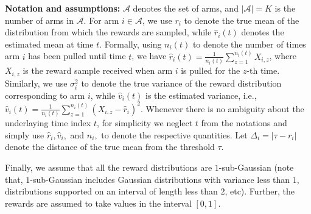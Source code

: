 \textbf{Notation and assumptions:} $\mathcal{A}$ denotes the set of arms, and $|\mathcal{A}|=K$ is the number of arms in $\mathcal{A}$. 
For arm $i\in\mathcal{A}$, we use $r_{i}$ to denote the true mean of the distribution from which the rewards are sampled, while $\hat{r}_{i}(t)$ denotes the estimated mean at time $t$. Formally, using $n_i(t)$ to denote the number of times arm $i$ has been pulled until time $t$, we have $\hat{r}_{i}(t)=\frac{1}{n_{i}(t)}\sum_{z=1}^{n_i(t)} X_{i,z}$, where $X_{i,z}$ is the reward sample received when arm $i$ is pulled for the $z$-th time. %
Similarly, we use $\sigma_{i}^{2}$ to denote the true variance of the reward distribution corresponding to arm $i$, while $\hat{v}_{i}(t)$ is the estimated variance, i.e., $\hat{v}_{i}(t)=\frac{1}{n_i(t)}\sum_{z=1}^{n_{i}(t)}(X_{i,z}-\hat{r}_{i})^{2}$. Whenever there is no ambiguity about the underlaying  time index $t$, for simplicity we neglect $t$ from the notations and simply use  $\hat{r}_i, \hat{v}_i,$ and $n_i, $ to denote the respective quantities.  Let  $\Delta_{i}=|\tau-r_{i}|$ denote the distance of the true mean from the threshold $\tau$.




 
Finally, we assume that all the reward distributions 
are $1$-sub-Gaussian (note that,  $1$-sub-Gaussian includes Gaussian distributions with variance less than $1$, distributions supported on an interval of length less than 2, etc). Further, the rewards are assumed to take values in the interval $[0,1]$.


